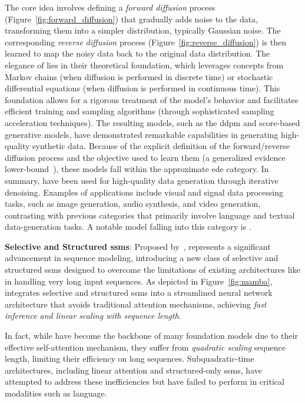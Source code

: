 The core idea involves defining a \emph{forward diffusion} process (Figure~\ref{fig:forward_diffusion}) that gradually adds noise to the data, transforming them into a simpler distribution, typically Gaussian noise. The corresponding \emph{reverse diffusion} process (Figure~\ref{fig:reverse_diffusion}) is then learned to map the noisy data back to the original data distribution.
%
The elegance of  lies in their theoretical foundation, which leverages concepts from Markov chains (when diffusion is performed in discrete time) or stochastic differential equations (when diffusion is performed in continuous time).
This foundation allows for a rigorous treatment of the model's behavior and facilitates efficient training and sampling algorithms (through sophisticated sampling acceleration techniques). 
The resulting models, such as the \gls{ddpm} and score-based generative models, have demonstrated remarkable capabilities in generating high-quality synthetic data.
Because of the explicit definition of the forward/reverse diffusion process and the objective used to learn them (\ie a generalized evidence lower-bound~\cite{kingma2024understanding}), these models fall within the approximate \gls{ede} category.
In summary,  have been used for high-quality data generation through iterative denoising. 
%
Examples of applications include visual and signal data processing tasks, such as image generation, audio synthesis, and video generation, contrasting with previous categories that primarily involve language and textual data-generation tasks. 
A notable model falling into this category is .
%

\vspace{5pt}
\noindent
\textbf{Selective and Structured \glspl{ssm}}: %
Proposed by~\citet{gu2023mamba},
 represents a significant advancement in sequence modeling, introducing a new class of selective and structured \glspl{ssm} designed to overcome the limitations of existing architectures like  in handling very long input sequences. 
%
As depicted in Figure~\ref{fig:mamba},  integrates selective and structured \glspl{ssm} into a streamlined neural network architecture that avoids traditional attention mechanisms, achieving \emph{fast inference and linear scaling with sequence length}.
%

In fact, while  have become the backbone of many foundation models due to their effective self-attention mechanism, they suffer from \emph{quadratic scaling} \wrt sequence length, limiting their efficiency on long sequences. Subquadratic-time architectures, including linear attention and structured-only \glspl{ssm}, have attempted to address these inefficiencies but have failed to perform in critical modalities such as language.

